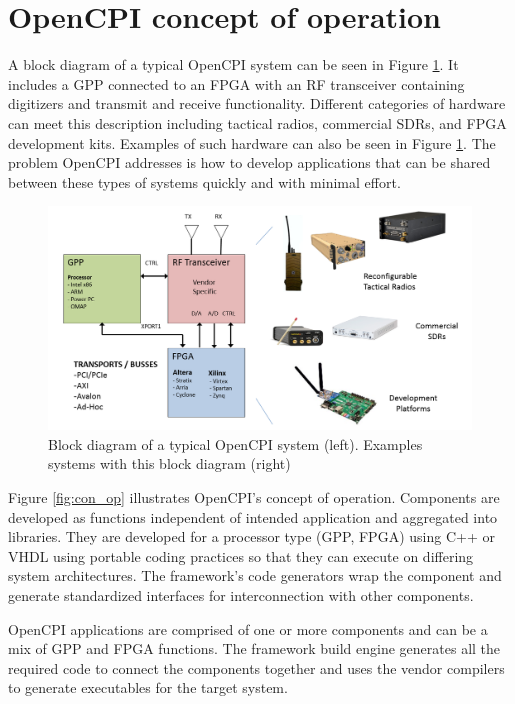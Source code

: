 \section*{OpenCPI concept of operation}
A block diagram of a typical OpenCPI system can be seen in Figure \ref{fig:sdr_block_diagram}. It includes a GPP connected to an FPGA with an RF transceiver containing digitizers and transmit and receive functionality. Different categories of hardware can meet this description including tactical radios, commercial SDRs, and FPGA development kits. Examples of such hardware can also be seen in Figure \ref{fig:sdr_block_diagram}. The problem OpenCPI addresses is how to develop applications that can be shared between these types of systems quickly and with minimal effort.\par
\begin{figure}[ht]
        \centering
        \includegraphics[scale=0.4]{./figures/sdr_block_diagram.png}
        \caption{Block diagram of a typical OpenCPI system (left). Examples systems with this block diagram (right)}
        \label{fig:sdr_block_diagram}
\end{figure}
\newpage
Figure \ref{fig:con_op} illustrates OpenCPI's concept of operation. Components are developed as functions independent of intended application and aggregated into libraries. They are developed for a processor type (GPP, FPGA) using C++ or VHDL using portable coding practices so that they can execute on differing system architectures. The framework's code generators wrap the component and generate standardized interfaces for interconnection with other components.\par
OpenCPI applications are comprised of one or more components and can be a mix of GPP and FPGA functions. The framework build engine generates all the required code to connect the components together and uses the vendor compilers to generate executables for the target system.\par
